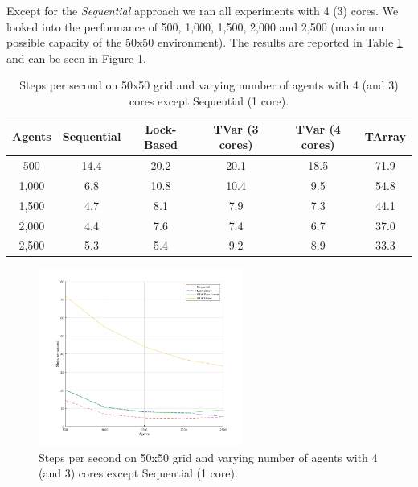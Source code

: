 Except for the \textit{Sequential} approach we ran all experiments with 4 (3) cores. We looked into the performance of 500, 1,000, 1,500, 2,000 and 2,500 (maximum possible capacity of the 50x50 environment). The results are reported in Table \ref{tab:state_results_agentsscale_time} and can be seen in Figure \ref{fig:state_results_agentsscale_time}.

\begin{table}
	\centering
  	\begin{tabular}{ c || c | c | c | c | c }
        Agents  & Sequential & Lock-Based & TVar (3 cores) & TVar (4 cores) & TArray  \\ \hline \hline 
    	500     & 14.4       & 20.2		  &	20.1           & 18.5       	& 71.9    \\ \hline
   		1,000   & 6.8        & 10.8 	  & 10.4           & 9.5       	    & 54.8    \\ \hline
   		1,500   & 4.7        & 8.1 		  & 7.9            & 7.3			& 44.1    \\ \hline
   		2,000   & 4.4        & 7.6 		  & 7.4            & 6.7    		& 37.0    \\ \hline 
   		2,500   & 5.3        & 5.4 		  & 9.2            & 8.9			& 33.3
   	\end{tabular}
  	
  	\caption{Steps per second on 50x50 grid and varying number of agents with 4 (and 3) cores except Sequential (1 core).}
	\label{tab:state_results_agentsscale_time}
\end{table}

\begin{figure}
	\centering
	\includegraphics[width=0.6\textwidth, angle=0]{./fig/sugarscape/varying_agents.png}
	\caption{Steps per second on 50x50 grid and varying number of agents with 4 (and 3) cores except Sequential (1 core).}
	\label{fig:state_results_agentsscale_time}
\end{figure}

